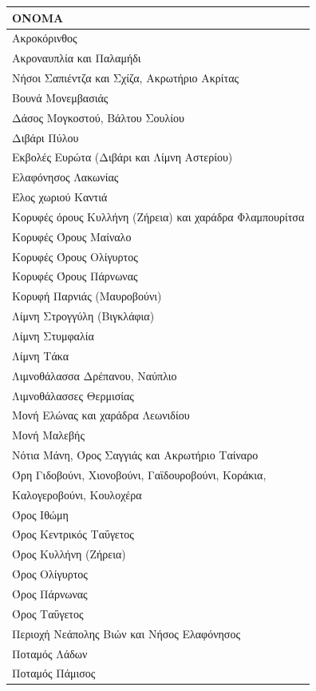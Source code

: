 \documentclass[12pt]{article}
\begin{document}
	\begin{table}[H]
		\centering
		\label{my-label}
		
		\begin{tabular}{|l|}
			\hline
			\textbf{ΟΝΟΜΑ} \\
			\hline
			Ακροκόρινθος \\ \hline
			Ακροναυπλία και Παλαμήδι \\ \hline
			Νήσοι Σαπιέντζα και Σχίζα, Ακρωτήριο Ακρίτας \\ \hline
			Βουνά Μονεμβασιάς \\ \hline
			Δάσος Μογκοστού, Βάλτου Σουλίου \\ \hline
			Διβάρι Πύλου \\ \hline
			Εκβολές Ευρώτα (Διβάρι και Λίμνη Αστερίου) \\ \hline
			Ελαφόνησος Λακωνίας \\ \hline
			Έλος χωριού Καντιά \\ \hline
			Κορυφές όρους Κυλλήνη (Ζήρεια) και χαράδρα Φλαμπουρίτσα \\ \hline
			Κορυφές Όρους Μαίναλο \\ \hline
			Κορυφές Όρους Ολίγυρτος \\ \hline
			Κορυφές Όρους Πάρνωνας \\ \hline
			Κορυφή Παρνιάς (Μαυροβούνι) \\ \hline
			Λίμνη Στρογγύλη (Βιγκλάφια) \\ \hline
			Λίμνη Στυμφαλία \\ \hline
			Λίμνη Τάκα \\ \hline
			Λιμνοθάλασσα Δρέπανου, Ναύπλιο \\ \hline
			Λιμνοθάλασσες Θερμισίας \\ \hline
			Μονή Ελώνας και χαράδρα Λεωνιδίου \\ \hline
			Μονή Μαλεβής \\ \hline
			Νότια Μάνη, Όρος Σαγγιάς και Ακρωτήριο Ταίναρο \\ \hline
			Όρη Γιδοβούνι, Χιονοβούνι, Γαϊδουροβούνι, Κοράκια, \\ Καλογεροβούνι, Κουλοχέρα  \\ \hline
			Όρος Ιθώμη \\ \hline
			Όρος Κεντρικός Ταΰγετος  \\ \hline
			Όρος Κυλλήνη (Ζήρεια) \\ \hline
			Όρος Ολίγυρτος \\ \hline
			Όρος Πάρνωνας \\ \hline
			Όρος Ταΰγετος  \\ \hline
			Περιοχή Νεάπολης Βιών και Νήσος Ελαφόνησος \\ \hline
			Ποταμός Λάδων \\ \hline
			Ποταμός Πάμισος \\ \hline
		\end{tabular}
	\end{table}
\end{document}
